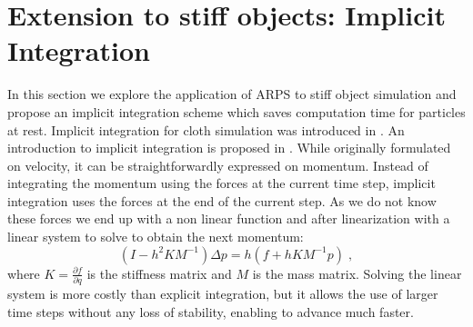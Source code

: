 \section{Extension to stiff objects: Implicit Integration} \label{sec cloth}
In this section we explore the application of ARPS to stiff object simulation and propose an implicit integration scheme which saves computation time for particles at rest.
Implicit integration for cloth simulation was introduced in \cite{Baraff1998}. An introduction to implicit integration is proposed in \cite{Witkin2001}.
While originally formulated on velocity, it can be straightforwardly expressed on momentum.
Instead of integrating the momentum using the forces at the current time step, implicit integration uses the forces at the end of the current step.
As we do not know these forces we end up with a non linear function and after linearization with a linear system to solve to obtain the next momentum:
\begin{equation}
    \label{eq:implicit}
    ( I -h^{2}KM^{-1} ) \Delta p = h( f + h KM^{-1}p ) \;,
\end{equation}
where $\displaystyle K = \frac{\partial f}{ \partial q}$ is the stiffness matrix and
$M$ is the mass matrix.
Solving the linear system is more costly than explicit integration, but it allows the use of larger time steps without any loss of stability, enabling to advance much faster.
